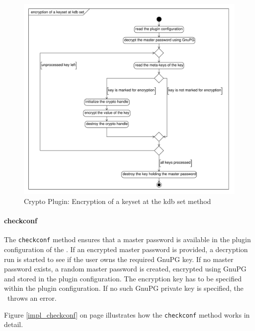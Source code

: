 \begin{figure}[h]
\center
\caption{Crypto Plugin: Encryption of a keyset at the kdb set method}
\label{impl_encrypt}
\includegraphics[width=15.0cm]{umlet-figures/impl_encrypt.pdf}
\end{figure}

\paragraph*{checkconf}
The \texttt{checkconf} method ensures that a master password is available in the plugin configuration of the \crypto.
If an encrypted master password is provided, a decryption run is started to see if the user owns the required GnuPG key.
If no master password exists, a random master password is created, encrypted using GnuPG and stored in the plugin configuration.
The encryption key has to be specified within the plugin configuration.
If no such GnuPG private key is specified, the \crypto ~throws an error.

Figure \ref{impl_checkconf} on page \pageref{impl_checkconf} illustrates how the \texttt{checkconf} method works in detail.

